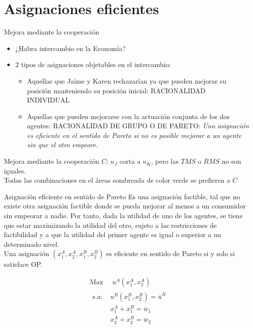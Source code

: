 \section[Asignación]{Asignaciones eficientes}

\begin{frame}{Mejora mediante la cooperación}
	\begin{itemize}
		\item ¿Habra intercambio en la Economía?
		\item 2 tipos de asignaciones objetables en el intercambio:
			\begin{itemize}
				\item Aquellas que Jaime y Karen rechazarían ya que pueden mejorar su posición manteniendo su posición inicial: RACIONALIDAD INDIVIDUAL
				\item Aquellas que pueden mejorarse con la actuación conjunta de los dos agentes: RACIONALIDAD DE GRUPO O DE PARETO: \emph{Una asignación es eficiente en el sentido de Pareto si no es posible mejorar a un agente sin que el otro empeore.}
			\end{itemize}
	\end{itemize}
\end{frame}
\begin{frame}{Mejora mediante la cooperación}
	$C$: $u_J$ corta a $u_K$, pero las $TMS$ o $RMS$ no son iguales.\\ 
		\medskip
	Todas las combinaciones en el áreas sombreada de color verde se prefieren a $C$\\
		\vspace{-0.6cm}
		
\end{frame}
\begin{frame}{Asignación eficiente en sentido de Pareto}
	Es una asignación factible, tal que no existe otra asignación factible donde se pueda mejorar al menos a un consumidor sin empeorar a nadie. Por tanto, dada la utilidad de uno de los agentes, se tiene que estar maximizando la utilidad del otro, sujeto a las restricciones de factibilidad y a que la utilidad del primer agente es igual o superior a un determinado nivel.\\
	\bigskip
	Una asignación $(x_{1}^{A},x_{2}^{A}, x_{1}^{B},x_{2}^{B})$ es eficiente en sentido de Pareto si y solo si satisface OP.
	
		\begin{align*}
			& \text{Max } \quad u^{A}\left(x_{1}^{A},x_{2}^{A}\right) \\
			& \begin{array}{ll}
				\text{s.a: } & u^{B}\left(x_{1}^{B},x_{2}^{B} \right) = \overline{u}^{B}\\
				& x_{1}^{A}+x_{1}^{B} = \overline{w}_1  \\
				& x_{2}^{A}+x_{2}^{B} = \overline{w}_2  
			\end{array}
		\end{align*}
\end{frame}
